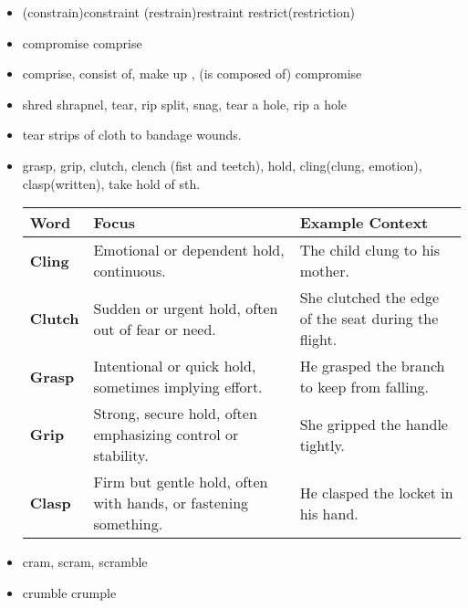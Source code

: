 \documentclass[a4paper,11pt,twoside]{book}
\begin{document}
\begin{itemize}
	\item (constrain)constraint (restrain)restraint restrict(restriction)
	
	\item compromise comprise 
	
	\item comprise, consist of, make up , (is composed of) compromise 
	
	\item shred shrapnel, tear, rip split, snag, tear a hole, rip a hole
	
	\item tear strips of cloth to bandage wounds. 
	
	\item grasp, grip, clutch, clench (fist and teetch),  hold, cling(clung, emotion), clasp(written), take hold of sth.
	
	\begin{tabular}{|l|p{6cm}|p{6cm}|}
		\hline
		\textbf{Word}   & \textbf{Focus}                                                                                 & \textbf{Example Context}                                      \\ \hline
		\textbf{Cling}  & Emotional or dependent hold, continuous.                                                  & The child clung to his mother.                        \\ \hline
		\textbf{Clutch} & Sudden or urgent hold, often out of fear or need.                                         & She clutched the edge of the seat during the flight.  \\ \hline
		\textbf{Grasp}  & Intentional or quick hold, sometimes implying effort.                                     & He grasped the branch to keep from falling.           \\ \hline
		\textbf{Grip}   & Strong, secure hold, often emphasizing control or stability.                              & She gripped the handle tightly.                       \\ \hline
		\textbf{Clasp}  & Firm but gentle hold, often with hands, or fastening something.                          & He clasped the locket in his hand.                    \\ \hline
	\end{tabular}
	
	\item cram, scram, scramble
	
	\item crumble crumple
	

\end{itemize}
\end{document}
